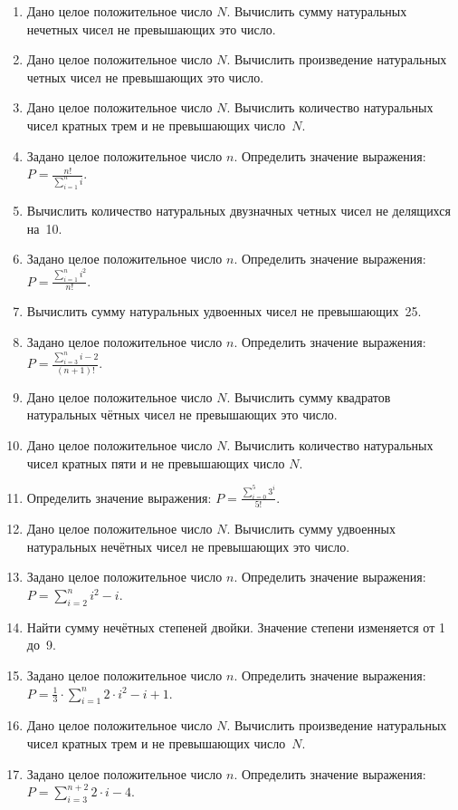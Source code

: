 \begin{enumerate}
\item Дано целое положительное число $N$. Вычислить сумму натуральных нечетных чисел не превышающих
это число.
\item Дано целое положительное число $N$. Вычислить произведение натуральных четных чисел не
превышающих это число.
\item Дано целое положительное число $N$. Вычислить количество натуральных чисел кратных трем и не
превышающих число~$N$.
\item Задано целое положительное число $n$. Определить значение выражения:
 $\displaystyle P=\frac{n!}{\sum\limits_{i=1}^{n}i}.$
\item Вычислить количество натуральных двузначных четных чисел не делящихся на~10.
\item Задано целое положительное число $n$. Определить значение выражения:
$\displaystyle P=\frac{\sum\limits_{i=1}^ni^2}{n!}.$
\item Вычислить сумму натуральных удвоенных чисел не превышающих~25.
\item Задано целое положительное число $n$. Определить значение выражения:
$P=\frac{\sum\limits_{i=3}^{n}i-2}{(n+1)!}.$
\item Дано целое положительное число $N$. Вычислить сумму квадратов натуральных чётных чисел не
превышающих это число.
\item Дано целое положительное число $N$. Вычислить количество натуральных чисел кратных пяти и не
превышающих число $N$.
\item Определить значение выражения:
 $P=\frac{\sum\limits_{i=0}^{5}3^{i}}{5!}.$
\item Дано целое положительное число $N$. Вычислить сумму удвоенных натуральных нечётных чисел не
превышающих это число.
\item Задано целое положительное число $n$. Определить значение выражения:
 $P=\sum\limits_{i=2}^{n}i^{2}-i.$
\item Найти сумму нечётных степеней двойки. Значение степени изменяется от 1 до~9.
\item Задано целое положительное число $n$. Определить значение выражения:
 $P=\frac{1}{3}\cdot {\sum\limits_{i=1}^{n}2\cdot i^{2}-i+1}.$
\item Дано целое положительное число $N$. Вычислить произведение натуральных чисел кратных трем и не
превышающих число~$N$.
\item Задано целое положительное число $n$. Определить значение выражения:
 $P=\sum\limits_{i=3}^{n+2}2\cdot i-4.$

\end{enumerate}
